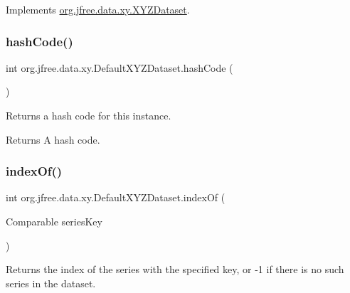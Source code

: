 Implements \mbox{\hyperlink{interfaceorg_1_1jfree_1_1data_1_1xy_1_1_x_y_z_dataset_a2aed0d6b0bbf979643691fc932efa2bc}{org.\+jfree.\+data.\+xy.\+X\+Y\+Z\+Dataset}}.

\mbox{\label{classorg_1_1jfree_1_1data_1_1xy_1_1_default_x_y_z_dataset_a6ec6b6e70f9a9befcd99300ed302b97d}} 
\subsubsection{\texorpdfstring{hash\+Code()}{hashCode()}}
{\footnotesize\ttfamily int org.\+jfree.\+data.\+xy.\+Default\+X\+Y\+Z\+Dataset.\+hash\+Code (\begin{DoxyParamCaption}{ }\end{DoxyParamCaption})}

Returns a hash code for this instance.

\begin{DoxyReturn}{Returns}
A hash code. 
\end{DoxyReturn}
\mbox{\label{classorg_1_1jfree_1_1data_1_1xy_1_1_default_x_y_z_dataset_a101e4548925084c18e0c2952ac13206f}} 
\subsubsection{\texorpdfstring{index\+Of()}{indexOf()}}
{\footnotesize\ttfamily int org.\+jfree.\+data.\+xy.\+Default\+X\+Y\+Z\+Dataset.\+index\+Of (\begin{DoxyParamCaption}\item[{Comparable}]{series\+Key }\end{DoxyParamCaption})}

Returns the index of the series with the specified key, or -\/1 if there is no such series in the dataset.


